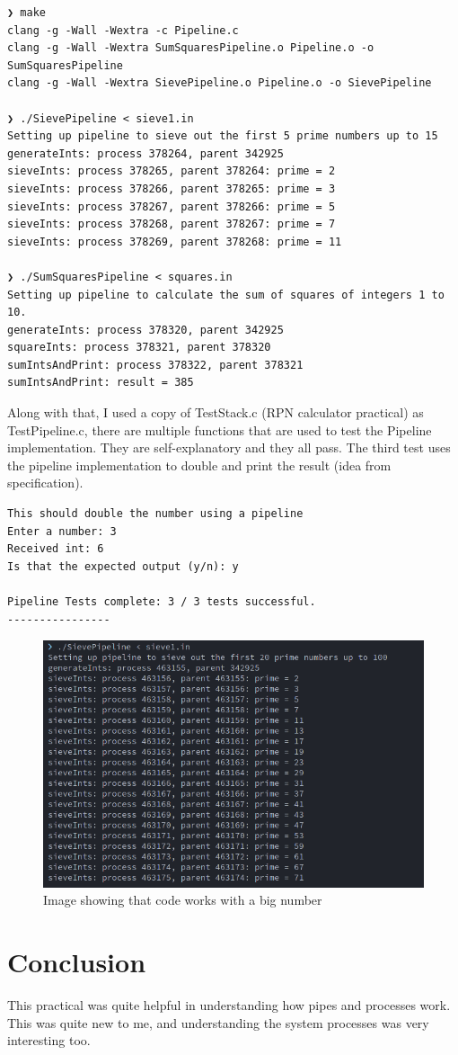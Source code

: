\documentclass[11pt]{article}
\begin{document}
\begin{verbatim}
❯ make
clang -g -Wall -Wextra -c Pipeline.c
clang -g -Wall -Wextra SumSquaresPipeline.o Pipeline.o -o SumSquaresPipeline
clang -g -Wall -Wextra SievePipeline.o Pipeline.o -o SievePipeline

❯ ./SievePipeline < sieve1.in
Setting up pipeline to sieve out the first 5 prime numbers up to 15
generateInts: process 378264, parent 342925
sieveInts: process 378265, parent 378264: prime = 2
sieveInts: process 378266, parent 378265: prime = 3
sieveInts: process 378267, parent 378266: prime = 5
sieveInts: process 378268, parent 378267: prime = 7
sieveInts: process 378269, parent 378268: prime = 11

❯ ./SumSquaresPipeline < squares.in
Setting up pipeline to calculate the sum of squares of integers 1 to 10.
generateInts: process 378320, parent 342925
squareInts: process 378321, parent 378320
sumIntsAndPrint: process 378322, parent 378321
sumIntsAndPrint: result = 385
\end{verbatim}

Along with that, I used a copy of TestStack.c (RPN calculator practical) as TestPipeline.c, there are multiple functions that are used to test the Pipeline implementation. They are self-explanatory and they all pass. The third test uses the pipeline implementation to double and print the result (idea from specification).\\

\begin{verbatim}
This should double the number using a pipeline
Enter a number: 3
Received int: 6
Is that the expected output (y/n): y

Pipeline Tests complete: 3 / 3 tests successful.
----------------
\end{verbatim}

\begin{figure}[htbp]
\centering
\includegraphics[width=.9\linewidth]{./images/sieveInts.png}
\caption{\label{Sieve Ints}Image showing that code works with a big number}
\end{figure}

\section{Conclusion}
\label{sec:orgd3f3b36}
This practical was quite helpful in understanding how pipes and processes work. This was quite new to me, and understanding the system processes was very interesting too.\\
\end{document}
